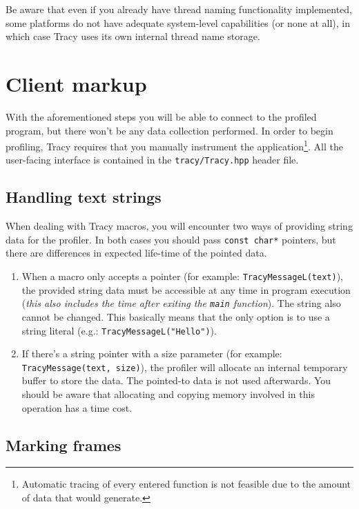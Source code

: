 \documentclass[hidelinks,titlepage,a4paper]{article}
\begin{document}
Be aware that even if you already have thread naming functionality implemented, some platforms do not have adequate system-level capabilities (or none at all), in which case Tracy uses its own internal thread name storage.

\section{Client markup}

With the aforementioned steps you will be able to connect to the profiled program, but there won't be any data collection performed. In order to begin profiling, Tracy requires that you manually instrument the application\footnote{Automatic tracing of every entered function is not feasible due to the amount of data that would generate.}. All the user-facing interface is contained in the \texttt{tracy/Tracy.hpp} header file.

\subsection{Handling text strings}

When dealing with Tracy macros, you will encounter two ways of providing string data for the profiler. In both cases you should pass \texttt{const char*} pointers, but there are differences in expected life-time of the pointed data.

\begin{enumerate}
\item When a macro only accepts a pointer (for example: \texttt{TracyMessageL(text)}), the provided string data must be accessible at any time in program execution (\emph{this also includes the time after exiting the \texttt{main} function}). The string also cannot be changed. This basically means that the only option is to use a string literal (e.g.: \texttt{TracyMessageL("Hello")}).

\item If there's a string pointer with a size parameter (for example: \texttt{TracyMessage(text, size)}), the profiler will allocate an internal temporary buffer to store the data. The pointed-to data is not used afterwards. You should be aware that allocating and copying memory involved in this operation has a time cost.
\end{enumerate}

\subsection{Marking frames}
\end{document}
